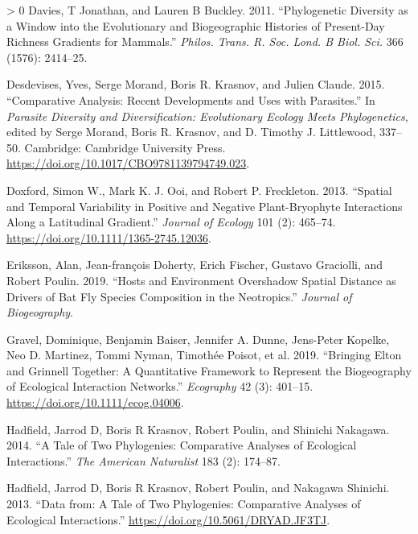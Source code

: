 \documentclass[11pt]{article}
\newlength{\cslhangindent}
\newenvironment{CSLReferences}[3] %
 {%
  \setlength{\parindent}{0pt}
  \ifodd #1 \everypar{\setlength{\hangindent}{\cslhangindent}}\ignorespaces\fi
  \ifnum #2 > 0
  \setlength{\parskip}{#2\baselineskip}
  \fi
 }%
 {}
\begin{document}
\begin{CSLReferences}{1}{0}
\leavevmode\hypertarget{ref-Davies2011PhyDiv}{}%
Davies, T Jonathan, and Lauren B Buckley. 2011. {``Phylogenetic
Diversity as a Window into the Evolutionary and Biogeographic Histories
of Present-Day Richness Gradients for Mammals.''} \emph{Philos. Trans.
R. Soc. Lond. B Biol. Sci.} 366 (1576): 2414--25.

\leavevmode\hypertarget{ref-Desdevises2015ComAna}{}%
Desdevises, Yves, Serge Morand, Boris R. Krasnov, and Julien Claude.
2015. {``Comparative Analysis: Recent Developments and Uses with
Parasites.''} In \emph{Parasite Diversity and Diversification:
Evolutionary Ecology Meets Phylogenetics}, edited by Serge Morand, Boris
R. Krasnov, and D. Timothy J. Littlewood, 337--50. Cambridge: Cambridge
University Press. \url{https://doi.org/10.1017/CBO9781139794749.023}.

\leavevmode\hypertarget{ref-Doxford2013SpaTem}{}%
Doxford, Simon W., Mark K. J. Ooi, and Robert P. Freckleton. 2013.
{``Spatial and Temporal Variability in Positive and Negative
Plant-Bryophyte Interactions Along a Latitudinal Gradient.''}
\emph{Journal of Ecology} 101 (2): 465--74.
\url{https://doi.org/10.1111/1365-2745.12036}.

\leavevmode\hypertarget{ref-Eriksson2019HosEnv}{}%
Eriksson, Alan, Jean-françois Doherty, Erich Fischer, Gustavo Graciolli,
and Robert Poulin. 2019. {``Hosts and Environment Overshadow Spatial
Distance as Drivers of Bat Fly Species Composition in the Neotropics.''}
\emph{Journal of Biogeography}.

\leavevmode\hypertarget{ref-Gravel2019BriElt}{}%
Gravel, Dominique, Benjamin Baiser, Jennifer A. Dunne, Jens-Peter
Kopelke, Neo D. Martinez, Tommi Nyman, Timothée Poisot, et al. 2019.
{``Bringing Elton and Grinnell Together: A Quantitative Framework to
Represent the Biogeography of Ecological Interaction Networks.''}
\emph{Ecography} 42 (3): 401--15.
\url{https://doi.org/10.1111/ecog.04006}.

\leavevmode\hypertarget{ref-Hadfield2014-tw}{}%
Hadfield, Jarrod D, Boris R Krasnov, Robert Poulin, and Shinichi
Nakagawa. 2014. {``A Tale of Two Phylogenies: Comparative Analyses of
Ecological Interactions.''} \emph{The American Naturalist} 183 (2):
174--87.

\leavevmode\hypertarget{ref-Hadfield2013DatTal}{}%
Hadfield, Jarrod D, Boris R Krasnov, Robert Poulin, and Nakagawa
Shinichi. 2013. {``Data from: A Tale of Two Phylogenies: Comparative
Analyses of Ecological Interactions.''}
\url{https://doi.org/10.5061/DRYAD.JF3TJ}.


\end{CSLReferences}
\end{document}
